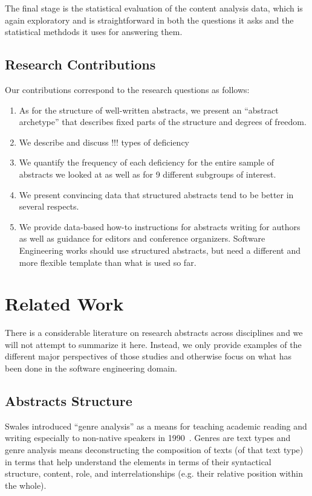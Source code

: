 \documentclass[10pt,journal,compsoc]{IEEEtran}
\begin{document}
The final stage is the statistical evaluation of the content analysis data,
which is again exploratory and is straightforward in both
the questions it asks and the statistical methdods it uses for answering them.


\subsection{Research Contributions}

Our contributions correspond to the research questions as follows:
\begin{enumerate}
	\item As for the structure of well-written abstracts, we present an ``abstract archetype''
	  that describes fixed parts of the structure and degrees of freedom. 
	\item We describe and discuss !!! types of deficiency 
	\item We quantify the frequency of each deficiency for the entire sample of abstracts
	  we looked at as well as for 9 different subgroups of interest.
	\item We present convincing data that structured abstracts tend to be better 
	  in several respects.
	\item We provide data-based how-to instructions for abstracts writing for authors
	  as well as guidance for editors and conference organizers.
	  Software Engineering works should use structured abstracts, but
	  need a different and more flexible template than what is used so far.
\end{enumerate}


\section{Related Work}

There is a considerable literature on research abstracts across disciplines
and we will not attempt to summarize it here.
Instead, we only provide examples of the different major perspectives of those studies
and otherwise focus on what has been done in the software engineering domain.


\subsection{Abstracts Structure}

Swales introduced ``genre analysis'' as a means for teaching academic reading and writing
especially to non-native speakers in 1990~\cite{Swales90}.
Genres are text types and genre analysis means deconstructing the composition
of texts (of that text type) in terms that help understand the elements in
terms of their syntactical structure, content, role, and interrelationships
(e.g. their relative position within the whole).
\end{document}
